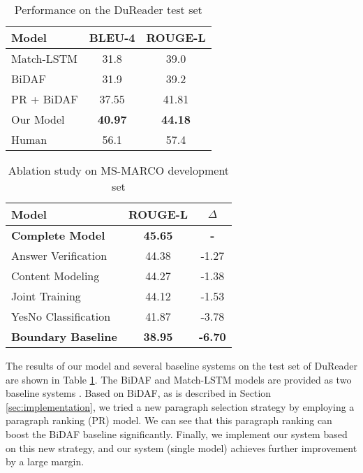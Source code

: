 \documentclass[11pt,a4paper]{article}
\newcommand{\tabref}[1]{Table \ref{#1}}
\newcommand{\secref}[1]{Section \ref{#1}}
\begin{document}
\begin{table}[tbp]
\centering
\begin{tabular}{|l|c|c|}
\hline
Model        & BLEU-4 & ROUGE-L \\ \hline
Match-LSTM   & 31.8   & 39.0  \\ 
BiDAF        & 31.9   & 39.2  \\
PR + BiDAF   & 37.55   & 41.81  \\ 
Our Model    & \textbf{40.97}   &  \textbf{44.18} \\ \hline
Human          & 56.1 & 57.4 \\ \hline
\end{tabular}
\caption{Performance on the DuReader test set}
\label{tab:dureader-results}
\end{table}

\begin{table}[tbp]
\centering
\begin{tabular}{|l|c|c|}
\hline
Model           & ROUGE-L & $\Delta$ \\ \hline
\textbf{Complete Model}      & \textbf{45.65}   &  \textbf{-} \\
 \- Answer Verification  &  44.38  & -1.27  \\
 \- Content Modeling   & 44.27   & -1.38  \\
 \- Joint Training  & 44.12   & -1.53         \\
 \- YesNo Classification &  41.87  &  -3.78 \\ 
\textbf{Boundary Baseline}   &  \textbf{38.95}  &  \textbf{-6.70} \\ \hline
\end{tabular}
\caption{Ablation study on MS-MARCO development set}
\label{tab:ablation}
\end{table}

The results of our model and several baseline systems on the test set of DuReader are shown in \tabref{tab:dureader-results}. The BiDAF and Match-LSTM models are provided as two baseline systems \cite{dureader}. Based on BiDAF, as is described in \secref{sec:implementation}, we tried a new paragraph selection strategy by employing a paragraph ranking (PR) model. We can see that this paragraph ranking can boost the BiDAF baseline significantly. Finally, we implement our system based on this new strategy, and our system (single model) achieves further improvement by a large margin.
\end{document}
